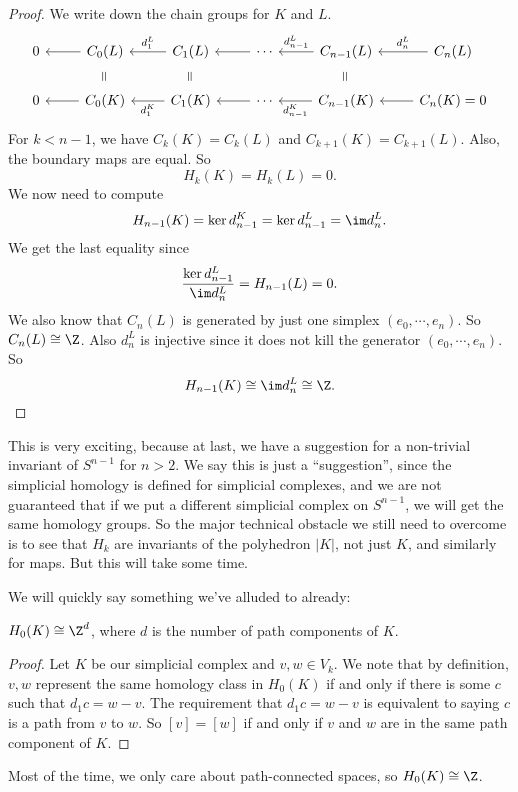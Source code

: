 \documentclass[a4paper]{article}
\begin{document}
\begin{proof}
  We write down the chain groups for $K$ and $L$.
  \[
    \begin{tikzcd}
      0 & C_0(L) \ar[l] \ar[d, phantom, "\rotatebox{90}{=}"] & C_1(L) \ar [l, "d_1^L"'] \ar[d, phantom, "\rotatebox{90}{=}"] & \cdots \ar[l] & C_{n - 1}(L) \ar[l, "d_{n - 1}^L"'] \ar[d, phantom, "\rotatebox{90}{=}"] & C_n(L) \ar[l, "d_n^L"']\\
      0 & C_0(K) \ar[l] & C_1(K) \ar [l, "d_1^K"] & \cdots \ar[l] & C_{n - 1}(K) \ar[l, "d_{n - 1}^K"] & C_n(K) = 0\ar[l]
    \end{tikzcd}
  \]
  For $k < n - 1$, we have $C_k(K) = C_k(L)$ and $C_{k + 1}(K) = C_{k + 1}(L)$. Also, the boundary maps are equal. So
  \[
    H_k(K) = H_k(L) = 0.
  \]
  We now need to compute
  \[
    H_{n - 1}(K) = \ker d_{n - 1}^K = \ker d_{n - 1}^L = \im d_n^L.
  \]
  We get the last equality since
  \[
    \frac{\ker d_{n - 1}^L}{\im d_n^L} = H_{n - 1}(L) = 0.
  \]
  We also know that $C_n (L)$ is generated by just one simplex $(e_0, \cdots, e_n)$. So $C_n(L) \cong \Z$. Also $d_n^L$ is injective since it does not kill the generator $(e_0, \cdots, e_n)$. So
  \[
    H_{n - 1}(K) \cong \im d_n^L \cong \Z.
  \]
\end{proof}
This is very exciting, because at last, we have a suggestion for a non-trivial invariant of $S^{n - 1}$ for $n > 2$. We say this is just a ``suggestion'', since the simplicial homology is defined for simplicial complexes, and we are not guaranteed that if we put a different simplicial complex on $S^{n - 1}$, we will get the same homology groups. So the major technical obstacle we still need to overcome is to see that $H_k$ are invariants of the polyhedron $|K|$, not just $K$, and similarly for maps. But this will take some time.

We will quickly say something we've alluded to already:
\begin{lemma}[Interpretation of $H_0$]
  $H_0(K) \cong \Z^d$, where $d$ is the number of path components of $K$.
\end{lemma}

\begin{proof}
  Let $K$ be our simplicial complex and $v, w \in V_k$. We note that by definition, $v, w$ represent the same homology class in $H_0(K)$ if and only if there is some $c$ such that $d_1 c = w - v$. The requirement that $d_1 c = w - v$ is equivalent to saying $c$ is a path from $v$ to $w$. So $[v] = [w]$ if and only if $v$ and $w$ are in the same path component of $K$.
\end{proof}
Most of the time, we only care about path-connected spaces, so $H_0(K) \cong \Z$.
\end{document}
